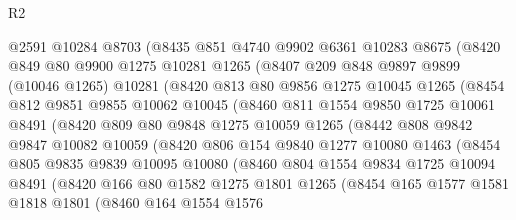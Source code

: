 \begin{lexlean}{R2}
\begin{coremodule}
        @2591
        @10284
        @8703
        (@8435
          @851
          @4740
          @9902
          @6361
          @10283
          @8675
          (@8420
            @849
            @80
            @9900
            @1275
            @10281
            @1265
            (@8407
              @209
              @848
              @9897
              @9899
              (@10046 @1265)
              @10281
              (@8420
                @813
                @80
                @9856
                @1275
                @10045
                @1265
                (@8454
                  @812
                  @9851
                  @9855
                  @10062
                  @10045
                  (@8460
                    @811
                    @1554
                    @9850
                    @1725
                    @10061
                    @8491
                    (@8420
                      @809
                      @80
                      @9848
                      @1275
                      @10059
                      @1265
                      (@8442
                        @808
                        @9842
                        @9847
                        @10082
                        @10059
                        (@8420
                          @806
                          @154
                          @9840
                          @1277
                          @10080
                          @1463
                          (@8454
                            @805
                            @9835
                            @9839
                            @10095
                            @10080
                            (@8460
                              @804
                              @1554
                              @9834
                              @1725
                              @10094
                              @8491
                              (@8420
                                @166
                                @80
                                @1582
                                @1275
                                @1801
                                @1265
                                (@8454
                                  @165
                                  @1577
                                  @1581
                                  @1818
                                  @1801
                                  (@8460
                                    @164
                                    @1554
                                    @1576

\end{coremodule}
\end{lexlean}
